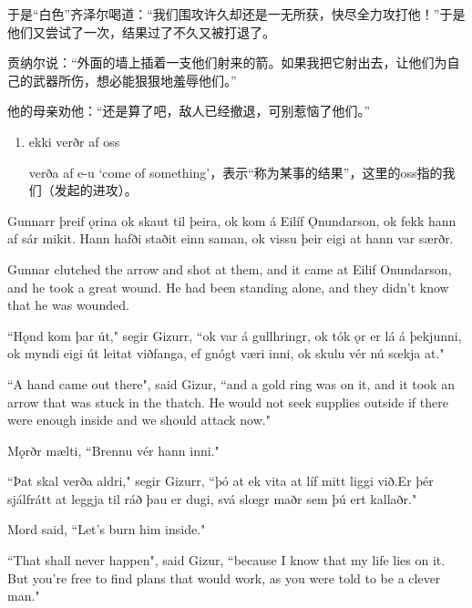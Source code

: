 \begin{translation*}{}
  于是“白色”齐泽尔喝道：“我们围攻许久却还是一无所获，快尽全力攻打他！”于是他们又尝试了一次，结果过了不久又被打退了。

  贡纳尔说：“外面的墙上插着一支他们射来的箭。如果我把它射出去，让他们为自己的武器所伤，想必能狠狠地羞辱他们。”

  他的母亲劝他：“还是算了吧，敌人已经撤退，可别惹恼了他们。”
\end{translation*}
\begin{grammar*}{}
  \begin{enumerate}[leftmargin=*]
    \item ekki verðr af oss

          verða af e-u `come of something'，表示“称为某事的结果”，这里的oss指的我们（发起的进攻）。
  \end{enumerate}
\end{grammar*}
\begin{paracol}{2}
  Gunnarr þreif ǫrina ok skaut til þeira, ok kom á Eilíf Ǫnundarson, ok fekk hann af sár mikit. Hann hafði staðit einn saman, ok vissu þeir eigi at hann var særðr.

  \switchcolumn
  Gunnar clutched the arrow and shot at them, and it came at Eilif Onundarson, and he took a great wound. He had been standing alone, and they didn't know that he was wounded.

  \switchcolumn*

  ``Hǫnd kom þar út," segir Gizurr, ``ok var á gullhringr, ok tók ǫr er lá á þekjunni, ok myndi eigi út leitat viðfanga, ef gnógt væri inni, ok skulu vér nú sœkja at."

  \switchcolumn

  ``A hand came out there", said Gizur, ``and a gold ring was on it, and it took an arrow that was stuck in the thatch. He would not seek supplies outside if there were enough inside and we should attack now."

  \switchcolumn*

  Mǫrðr mælti, ``Brennu vér hann inni."

  ``Þat skal verða aldri," segir Gizurr, ``þó at ek vita at líf mitt liggi við.\footnotemark Er þér sjálfrátt at leggja til ráð þau er dugi, svá slœgr maðr sem þú ert kallaðr."

  \switchcolumn

  Mord said, ``Let's burn him inside."

  ``That shall never happen", said Gizur, ``because I know that my life lies on it. But you're free to find plans that would work, as you were told to be a clever man."
\end{paracol}


